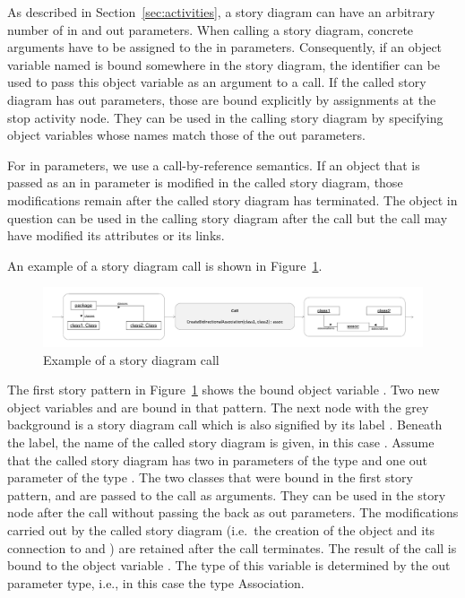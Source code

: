 As described in Section~\ref{sec:activities}, a story diagram can have an arbitrary number of in and out parameters. When calling a story diagram, concrete arguments have to be assigned to the in parameters. Consequently, if an object variable named  is bound somewhere in the story diagram, the identifier  can be used to pass this object variable as an argument to a call. If the called story diagram has out parameters, those are bound explicitly by assignments at the stop activity node. They can be used in the calling story diagram by specifying object variables whose names match those of the out parameters.

For in parameters, we use a call-by-reference semantics. If an object that is passed as an in parameter is modified in the called story diagram, those modifications remain after the called story diagram has terminated. The object in question can be used in the calling story diagram after the call but the call may have modified its attributes or its links.

An example of a story diagram call is shown in Figure~\ref{fig:call}.

\begin{figure}[htb]
\begin{center}
  \includegraphics[width=\textwidth]{figures/StoryDiagramCall}
  \caption{Example of a story diagram call}
  \label{fig:call}
\end{center}
\end{figure}

The first story pattern in Figure~\ref{fig:call} shows the bound object variable . Two new object variables  and  are bound in that pattern. The next node with the grey background is a story diagram call which is also signified by its label . Beneath the label, the name of the called story diagram is given, in this case . Assume that the called story diagram has two in parameters of the type  and one out parameter of the type . The two classes that were bound in the first story pattern,  and  are passed to the call as arguments. They can be used in the story node after the call without passing the back as out parameters. The modifications carried out by the called story diagram (i.e.\ the creation of the  object and its connection to  and ) are retained after the call terminates.
The result of the call is bound to the object variable . The type of this variable is determined by the out parameter type, i.e., in this case the type Association.

